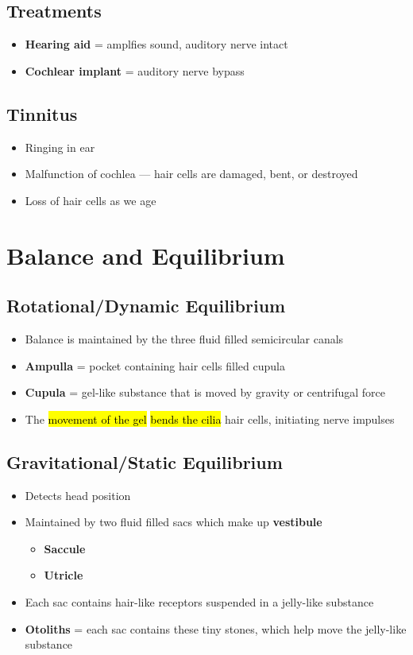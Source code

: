 \documentclass[a4paper,12pt]{article}
\begin{document}
\subsection{Treatments}
\begin{itemize}
    \item{\textbf{Hearing aid} = amplfies sound, auditory nerve intact}
    \item{\textbf{Cochlear implant} = auditory nerve bypass}
\end{itemize}

\subsection{Tinnitus}
\begin{itemize}
    \item{Ringing in ear}
    \item{Malfunction of cochlea --- hair cells are damaged, bent, or destroyed}
    \item{Loss of hair cells as we age}
\end{itemize}

\section{Balance and Equilibrium}
\subsection{Rotational/Dynamic Equilibrium}
\begin{itemize}
    \item{Balance is maintained by the three fluid filled semicircular canals}
    \item{\textbf{Ampulla} = pocket containing hair cells filled cupula}
    \item{\textbf{Cupula} = gel-like substance that is moved by gravity or centrifugal force}
    \item{The \hl{movement of the gel} \hl{bends the cilia} hair cells, initiating nerve impulses}
\end{itemize}

\subsection{Gravitational/Static Equilibrium}
\begin{itemize}
    \item{Detects head position}
    \item{
            Maintained by two fluid filled sacs which make up \textbf{vestibule}
            \begin{itemize}
                \item{\textbf{Saccule}}
                \item{\textbf{Utricle}}
            \end{itemize}
        }
    \item{Each sac contains hair-like receptors suspended in a jelly-like substance}
    \item{\textbf{Otoliths} = each sac contains these tiny stones, which help move the jelly-like substance}
\end{itemize}
\end{document}
